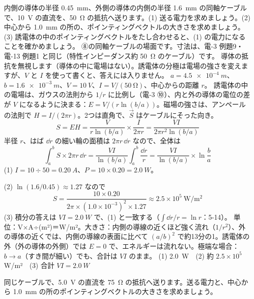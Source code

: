 \begin{phreidai}[同軸ケーブルの中を流れるエネルギー]
\label{ph:電-14:ex6}内側の導体の半径 \qty{0.45}{mm}、外側の導体の内側の半径 \qty{1.6}{mm} の同軸ケーブルで、\qty{10}{V} の直流を、\qty{50}{\ohm} の抵抗へ送ります。(1) 送る電力を求めましょう。(2) 中心から \qty{1.0}{mm} の所の、ポインティングベクトルの大きさを求めましょう。(3) 誘電体の中のポインティングベクトルをたし合わせると、(1) の電力になることを確かめましょう。
\phbamen
⑧の同軸ケーブルの場面です。寸法は、電-3 例題9・電-13 例題1 と同じ（特性インピーダンス約 \qty{50}{\ohm} のケーブル）です。
\phmushi
導体の抵抗を無視します（導体の中に電場はない）。誘電体の分極は電場の強さを変えますが、$V$ と $I$ を使って書くと、答えには入りません。
\phzu
$a=\qty{4.5e-4}{m}$、$b=\qty{1.6e-3}{m}$、$V=\qty{10}{V}$、$I=V/(\qty{50}{\ohm})$、中心からの距離 $r$。
\phriyu
誘電体の中の電場は、ガウスの法則から $1/r$ に比例し（電-3 ⑩）、内と外の導体の電位の差が $V$ になるように決まる：$E=V/(r\ln(b/a))$。磁場の強さは、アンペールの法則で $H=I/(2\pi r)$。2つは直角で、$\vec S$ はケーブルにそった向き。
\phtateru
\[ S=EH=\frac{V}{r\ln(b/a)}\times\frac{I}{2\pi r}=\frac{VI}{2\pi r^2\ln(b/a)} \]
半径 $r$、はば $\dd r$ の細い輪の面積は $2\pi r\,\dd r$ なので、全体は
\[ \int_a^b S\times2\pi r\,\dd r=\frac{VI}{\ln(b/a)}\int_a^b\frac{\dd r}{r}=\frac{VI}{\ln(b/a)}\times\ln\frac{b}{a} \]
\phtoku
(1) $I=10\div50=\qty{0.20}{A}$、$P=10\times0.20=\qty{2.0}{W}$。\par
(2) $\ln(1.6/0.45)\approx1.27$ なので
\[ S=\frac{10\times0.20}{2\pi\times(1.0\times10^{-3})^2\times1.27}\approx2.5\times10^5\ \mathrm{W/m^2} \]
(3) 積分の答えは $VI=\qty{2.0}{W}$ で、(1) と一致する（$\int\dd r/r=\ln r$：5-14）。
\phtashikame
単位：V×A÷(m²)＝W/m²。大きさ：内側の導線の近くほど強く流れ（$1/r^2$）、外の導体の近くでは、内側の導線の表面に比べて $(a/b)^2$ で約13分の1。誘電体の外（外の導体の外側）では $E=0$ で、エネルギーは流れない。極端な場合：$b\to a$（すき間が細い）でも、合計は $VI$ のまま。
\kotae (1) \qty{2.0}{W}　(2) 約 $2.5\times10^5$\,W/m²　(3) 合計 $VI=\qty{2.0}{W}$
\end{phreidai}
\begin{jibun}
同じケーブルで、\qty{5.0}{V} の直流を \qty{75}{\ohm} の抵抗へ送ります。送る電力と、中心から \qty{1.0}{mm} の所のポインティングベクトルの大きさを求めましょう。
\end{jibun}

